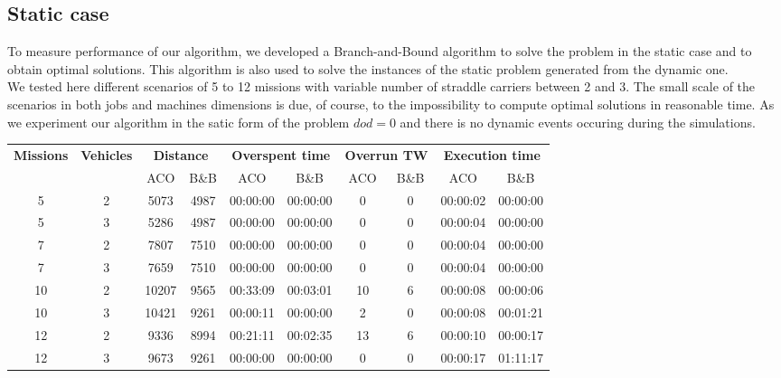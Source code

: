 \documentclass[a4paper,10pt]{article}
\begin{document}
	\subsection{Static case}
  To measure performance of our algorithm, we developed a Branch-and-Bound algorithm to solve the problem in the static case and to obtain optimal solutions. This algorithm is also used to solve the instances of the static problem generated from the dynamic one.\\

  We tested here different scenarios of 5 to 12 missions with variable number of straddle carriers between 2 and 3. The small scale of the scenarios in both jobs and machines dimensions is due, of course, to the impossibility to compute optimal solutions in reasonable time.
  As we experiment our algorithm in the satic form of the problem $dod=0$ and there is no dynamic events occuring during the simulations.

  \small
  \begin{center}
    \begin{tabular}{|c|c|c|c|c|c|c|c|c|c|} 
    \hline
      \multirow{2}{*}{\bf{Missions}} & \multirow{2}{*}{\bf{Vehicles}} & \multicolumn{2}{|c|}{\bf{Distance}} & \multicolumn{2}{|c|}{\bf{Overspent time}} & \multicolumn{2}{|c|}{\bf{Overrun TW}} &  \multicolumn{2}{|c|}{\bf{Execution time}} \\\cline{3-10}
		 &	& ACO 	& B\&B	& ACO	& B\&B		& ACO		& B\&B	& ACO		& B\&B\\ \hline
	5	 & 2 	& 5073	& 4987	& 00:00:00	& 00:00:00 	& 0	& 0	& 00:00:02	& 00:00:00\\
	5	 & 3 	& 5286	& 4987	& 00:00:00	& 00:00:00	& 0	& 0	& 00:00:04	& 00:00:00\\
	7	 & 2	& 7807	& 7510	& 00:00:00	& 00:00:00	& 0	& 0	& 00:00:04	& 00:00:00\\
	7	 & 3	& 7659	& 7510	& 00:00:00	& 00:00:00	& 0	& 0	& 00:00:04	& 00:00:00\\
	10	 & 2	& 10207	& 9565	& 00:33:09	& 00:03:01	& 10	& 6	& 00:00:08	& 00:00:06\\
	10	 & 3	& 10421	& 9261	& 00:00:11	& 00:00:00	& 2	& 0	& 00:00:08	& 00:01:21\\
	12	 & 2	& 9336	& 8994	& 00:21:11	& 00:02:35	& 13	& 6	& 00:00:10	& 00:00:17\\
	12	 & 3	& 9673	& 9261	& 00:00:00	& 00:00:00	& 0	& 0	& 00:00:17	& 01:11:17\\
      \hline
    \end{tabular}
  \end{center}
  \normalsize
\end{document}
